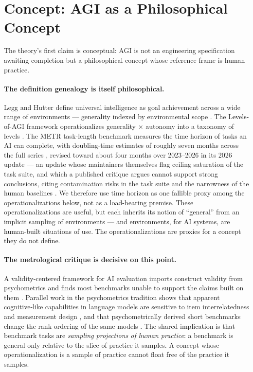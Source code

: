\documentclass[10pt]{article}
\begin{document}
\section{Concept: AGI as a Philosophical Concept}\label{sec:concept}

The theory's first claim is conceptual: AGI is not an engineering specification awaiting completion but a philosophical concept whose reference frame is human practice. \paragraph{The definition genealogy is itself philosophical.}
Legg and Hutter define universal intelligence as goal achievement across a wide range of environments --- generality indexed by environmental scope \cite{legg2007universal}. The Levels-of-AGI framework operationalizes generality $\times$ autonomy into a taxonomy of levels \cite{morris2023levels}. The METR task-length benchmark measures the time horizon of tasks an AI can complete, with doubling-time estimates of roughly seven months across the full series \cite{kwa2025measuring}, revised toward about four months over 2023--2026 in its 2026 update \cite{metr2026th11} --- an update whose maintainers themselves flag ceiling saturation of the task suite, and which a published critique argues cannot support strong conclusions, citing contamination risks in the task suite and the narrowness of the human baselines \cite{witkin2026metr}. We therefore use time horizon as one fallible proxy among the operationalizations below, not as a load-bearing premise. These operationalizations are useful, but each inherits its notion of ``general'' from an implicit sampling of environments --- and environments, for AI systems, are human-built situations of use. The operationalizations are proxies for a concept they do not define.

\paragraph{The metrological critique is decisive on this point.}
A validity-centered framework for AI evaluation imports construct validity from psychometrics and finds most benchmarks unable to support the claims built on them \cite{salaudeen2025measurement}. Parallel work in the psychometrics tradition shows that apparent cognitive-like capabilities in language models are sensitive to item interrelatedness and measurement design \cite{ilic2024evidence}, and that psychometrically derived short benchmarks change the rank ordering of the same models \cite{gignac2025psychometrically}. The shared implication is that benchmark tasks are \emph{sampling projections of human practice}: a benchmark is general only relative to the slice of practice it samples. A concept whose operationalization is a sample of practice cannot float free of the practice it samples.
\end{document}
